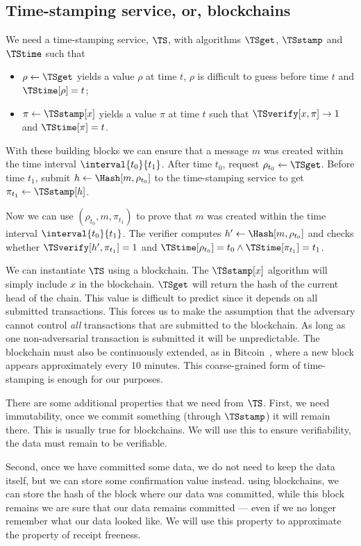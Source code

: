 \subsection{Time-stamping service, or, blockchains}%
\label{StorageProperties}


We need a time-stamping service, \(\TS\), with algorithms \(\TSget\), 
\(\TSstamp\) and \(\TStime\) such that
\begin{itemize}
  \item \(\rho \gets \TSget\) yields a value \(\rho\) at time \(t\), \(\rho\) is 
    difficult to guess before time \(t\) and \(\TStime[\rho] = t\);
  \item \(\pi\gets \TSstamp[x]\) yields a value \(\pi\) at time \(t\) such that 
    \(\TSverify[x, \pi]\to 1\) and \(\TStime[\pi] = t\).
\end{itemize}

With these building blocks we can ensure that a message \(m\) was created within 
the time interval \(\interval{t_0}{t_1}\).
After time \(t_0\), request \(\rho_{t_0}\gets \TSget\).
Before time \(t_1\), submit \(h\gets \Hash[m, \rho_{t_0}]\) to the time-stamping 
service to get \(\pi_{t_1}\gets \TSstamp[h]\).

Now we can use \((\rho_{t_0}, m, \pi_{t_1})\) to prove that \(m\) was created 
within the time interval \(\interval{t_0}{t_1}\).
The verifier computes \(h'\gets \Hash[m, \rho_{t_0}]\) and checks whether 
\(\TSverify[h', \pi_{t_1}] = 1\) and \(\TStime[\rho_{t_0}] = t_0\land 
  \TStime[\pi_{t_1}] = t_1\).

We can instantiate \(\TS\) using a blockchain.
The \(\TSstamp[x]\) algorithm will simply include \(x\) in the blockchain.
\(\TSget\) will return the hash of the current head of the chain.
This value is difficult to predict since it depends on all submitted 
transactions.
This forces us to make the assumption that the adversary cannot control 
\emph{all} transactions that are submitted to the blockchain.
As long as one non-adversarial transaction is submitted it will be 
unpredictable.
The blockchain must also be continuously extended, \eg as in
Bitcoin~\cite{Bitcoin}, where a new block appears approximately every 10 
minutes.
This coarse-grained form of time-stamping is enough for our purposes.

There are some additional properties that we need from \(\TS\).
First, we need immutability, \ie once we commit something (through \(\TSstamp\)) 
it will remain there.
This is usually true for blockchains.
We will use this to ensure verifiability, the data must remain to be verifiable.

Second, once we have committed some data, we do not need to keep the data 
itself, but we can store some confirmation value instead.
\Eg using blockchains, we can store the hash of the block where our data was 
committed, while this block remains we are sure that our data remains committed 
--- even if we no longer remember what our data looked like.
We will use this property to approximate the property of receipt freeness.
